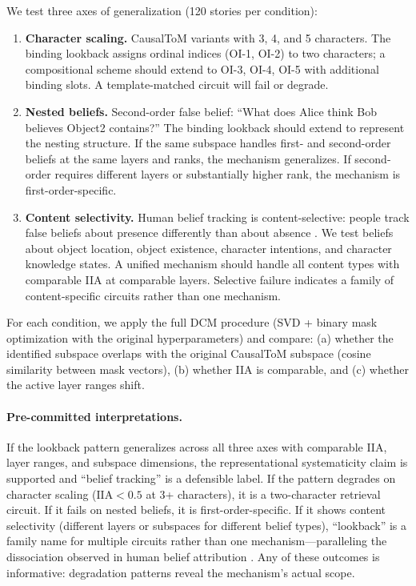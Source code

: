 \documentclass{article}
\begin{document}
We test three axes of generalization (120 stories per condition):

\begin{enumerate}
\item \textbf{Character scaling.} CausalToM variants with 3, 4, and 5 characters. The binding lookback assigns ordinal indices (OI-1, OI-2) to two characters; a compositional scheme should extend to OI-3, OI-4, OI-5 with additional binding slots. A template-matched circuit will fail or degrade.
\item \textbf{Nested beliefs.} Second-order false belief: ``What does Alice think Bob believes Object2 contains?'' The binding lookback should extend to represent the nesting structure. If the same subspace handles first- and second-order beliefs at the same layers and ranks, the mechanism generalizes. If second-order requires different layers or substantially higher rank, the mechanism is first-order-specific.
\item \textbf{Content selectivity.} Human belief tracking is content-selective: people track false beliefs about presence differently than about absence \citep{schuwerk2015implicit}. We test beliefs about object location, object existence, character intentions, and character knowledge states. A unified mechanism should handle all content types with comparable IIA at comparable layers. Selective failure indicates a family of content-specific circuits rather than one mechanism.
\end{enumerate}

For each condition, we apply the full DCM procedure (SVD + binary mask optimization with the original hyperparameters) and compare: (a) whether the identified subspace overlaps with the original CausalToM subspace (cosine similarity between mask vectors), (b) whether IIA is comparable, and (c) whether the active layer ranges shift.

\paragraph{Pre-committed interpretations.} If the lookback pattern generalizes across all three axes with comparable IIA, layer ranges, and subspace dimensions, the representational systematicity claim is supported and ``belief tracking'' is a defensible label. If the pattern degrades on character scaling ($\text{IIA} < 0.5$ at 3+ characters), it is a two-character retrieval circuit. If it fails on nested beliefs, it is first-order-specific. If it shows content selectivity (different layers or subspaces for different belief types), ``lookback'' is a family name for multiple circuits rather than one mechanism---paralleling the dissociation observed in human belief attribution \citep{apperly2009humans}. Any of these outcomes is informative: degradation patterns reveal the mechanism's actual scope.
\end{document}
